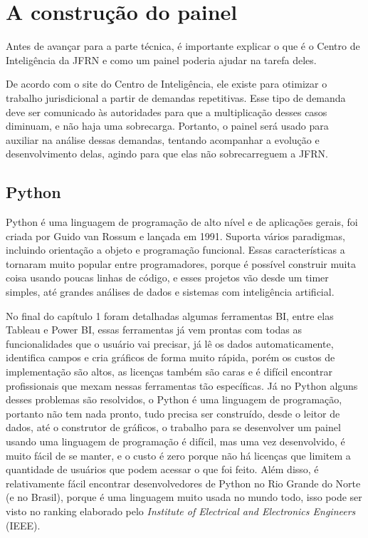 \chapter{A construção do painel}\label{cap_trabalho_academico}

Antes de avançar para a parte técnica, é importante explicar o que é o Centro de Inteligência da JFRN e como um painel poderia ajudar na tarefa deles.

De acordo com o site do Centro de Inteligência, ele existe para otimizar o trabalho jurisdicional a partir de demandas repetitivas. Esse tipo de demanda deve ser comunicado às autoridades para que a multiplicação desses casos diminuam, e não haja uma sobrecarga. Portanto, o painel será usado para auxiliar na análise dessas demandas, tentando acompanhar a evolução e desenvolvimento delas, agindo para que elas não sobrecarreguem a JFRN.


\section{Python}

Python é uma linguagem de programação de alto nível e de aplicações gerais, foi criada por Guido van Rossum e lançada em 1991. Suporta vários paradigmas, incluindo orientação a objeto e programação funcional. Essas características a tornaram muito popular entre programadores, porque é possível construir muita coisa usando poucas linhas de código, e esses projetos vão desde um timer simples, até grandes análises de dados e sistemas com inteligência artificial.

No final do capítulo 1 foram detalhadas algumas ferramentas BI, entre elas Tableau e Power BI, essas ferramentas já vem prontas com todas as funcionalidades que o usuário vai precisar, já lê os dados automaticamente, identifica campos e cria gráficos de forma muito rápida, porém os custos de implementação são altos, as licenças também são caras e é difícil encontrar profissionais que mexam nessas ferramentas tão específicas. Já no Python alguns desses problemas são resolvidos, o Python é uma linguagem de programação, portanto não tem nada pronto, tudo precisa ser construído, desde o leitor de dados, até o construtor de gráficos, o trabalho para se desenvolver um painel usando uma linguagem de programação é difícil, mas uma vez desenvolvido, é muito fácil de se manter, e o custo é zero porque não há licenças que limitem a quantidade de usuários que podem acessar o que foi feito. Além disso, é relativamente fácil encontrar desenvolvedores de Python no Rio Grande do Norte (e no Brasil), porque é uma linguagem muito usada no mundo todo, isso pode ser visto no ranking elaborado pelo \textit{Institute of Electrical and Electronics Engineers} (IEEE).

